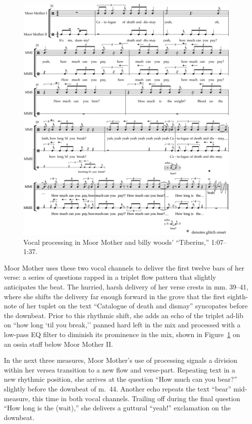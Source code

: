 \begin{figure}[!p]
    \centering
    \includegraphics[width=\textwidth]{images/figures/chp 03/107136tiberiusprocessing.pdf}
    \caption{Vocal processing in Moor Mother and billy woods' ``Tiberius,'' 1:07--1:37.}
    \label{fig:moormotherprocess}
\end{figure}

Moor Mother uses these two vocal channels to deliver the first twelve bars of her verse: a series of questions rapped
in a triplet flow pattern that slightly anticipates the beat. The hurried, harsh delivery of her verse crests in mm. 
39--41, where she shifts the delivery far enough forward in the grove that the first eighth-note of her tuplet on the
text ``Catalogue of death and dismay'' syncopates before the downbeat. Prior to this rhythmic shift, she adds an echo
of the triplet ad-lib on ``how long `til you break,'' panned hard left in the mix and processed with a low-pass EQ
filter to diminish its prominence in the mix, shown in Figure~\ref{fig:moormotherprocess} on an ossia staff below Moor
Mother II.

In the next three measures, Moor Mother's use of processing signals a division within her verse\textemdash a transition
to a new flow and verse-part. Repeating text in a new rhythmic position, she arrives at the question ``How much can you 
bear?'' slightly before the downbeat of m.~44. Another echo repeats the text ``bear'' mid-measure, this time in both vocal
channels. Trailing off during the final question ``How long is the (wait),'' she delivers a guttural ``yeah!'' exclamation
on the downbeat.

